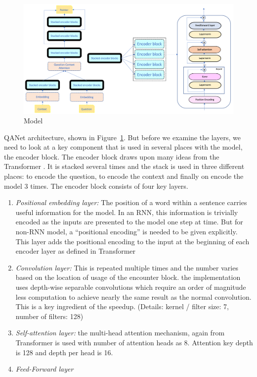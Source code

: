 \documentclass{article}
\begin{document}
\begin{figure}[h]
  \vspace{-10pt}
  \centering
  \includegraphics[width=0.5\linewidth]{../images/qanet_architecture.png}
    \caption{Model}
      \label{model-figure}
\end{figure} 
QANet architecture, shown in Figure~\ref{model-figure}. But before we examine the layers, we need to look at a key component that is used in several places with the model, the encoder block. The encoder block draws upon many ideas from the Transformer \cite{vaswani2017attention}. It is stacked several times and the stack is used in three different places: to encode the question, to encode the context and finally on encode the model 3 times. 
The encoder block consists of four key layers.
\begin{enumerate}
  \item {\textit{Positional embedding layer:} The position of a word within a sentence carries useful information for the model. In an RNN, this information is trivially encoded as the inputs are presented to the model one step at time. But for non-RNN model, a “positional encoding” is needed to be given explicitly. This layer adds the positional encoding to the input at the beginning of each encoder layer as defined in Transformer}
  \item {\textit{Convolution layer:} This is repeated multiple times and the number varies based on the location of usage of the encounter block. the implementation uses depth-wise separable convolutions \cite{chollet2017xception} which require an order of magnitude less computation to achieve nearly the same result as the normal convolution. This is a key ingredient of the speedup. (Details: kernel / filter size: 7, number of filters: 128)}
  \item {\textit{Self-attention layer:} the multi-head attention mechanism, again from Transformer is used with number of attention heads as 8. Attention key depth is 128 and depth per head is 16.}
  \item {\textit{Feed-Forward layer}}
\end{enumerate}
\end{document}
